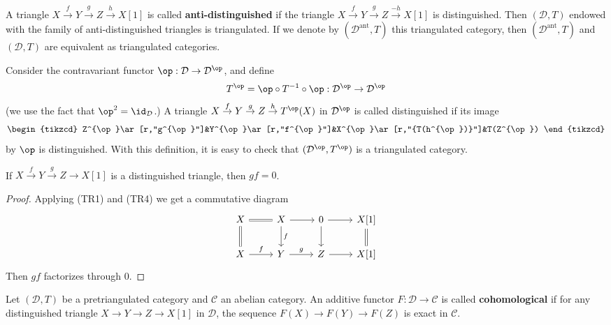 \begin{remark}
A triangle $X\stackrel{f}{\to} Y\stackrel{g}{\to} Z\stackrel{h}{\to} X[1]$ is called \textbf{anti-distinguished} if the triangle $X\stackrel{f}{\to} Y\stackrel{g}{\to} Z\stackrel{-h}{\to} X[1]$ is distinguished. Then $(\mathcal{D},T)$ endowed with the family of anti-distinguished triangles is triangulated. If we denote by $(\mathcal{D}^{\text{ant}},T)$ this triangulated category, then $(\mathcal{D}^{\text{ant}},T)$ and $(\mathcal{D},T)$ are equivalent as triangulated categories.
\end{remark}

\begin{remark}
Consider the contravariant functor $\op:\mathcal{D}\to\mathcal{D}^{\op}$, and define
\[T^{\op}=\op\circ T^{-1}\circ\op:\mathcal{D}^{\op}\to\mathcal{D}^{\op}\]
(we use the fact that $\op^2=\id_\mathcal{D}$.) A triangle $X\stackrel{f}{\to} Y\stackrel{g}{\to} Z\stackrel{h}{\to} T^{\op}(X)$ in $\mathcal{D}^{\op}$ is called distinguished if its image
\[\begin{tikzcd}
Z^{\op}\ar[r,"g^{\op}"]&Y^{\op}\ar[r,"f^{\op}"]&X^{\op}\ar[r,"{T(h^{\op})}"]&T(Z^{\op})
\end{tikzcd}
\]
by $\op$ is distinguished. With this definition, it is easy to check that $(\mathcal{D}^{\op},T^{\op})$ is a triangulated category.
\end{remark}

\begin{proposition}\label{triangle cat dt composition zero}
If $X\stackrel{f}{\to} Y\stackrel{g}{\to} Z\to X[1]$ is a distinguished triangle, then $gf=0$.
\end{proposition}
\begin{proof}
Applying (TR1) and (TR4) we get a commutative diagram
\[\begin{tikzcd}
X\ar[r,equal]\ar[d,equal]&X\ar[d,"f"]\ar[r]&0\ar[d]\ar[r]&X[1]\ar[d,equal]\\
X\ar[r,"f"]&Y\ar[r,"g"]&Z\ar[r]&X[1]
\end{tikzcd}\]
Then $gf$ factorizes through $0$.
\end{proof}

\begin{definition}
Let $(\mathcal{D},T)$ be a pretriangulated category and $\mathcal{C}$ an abelian category. An additive functor $F:\mathcal{D}\to\mathcal{C}$ is called \textbf{cohomological} if for any distinguished triangle $X\to Y\to Z\to X[1]$ in $\mathcal{D}$, the sequence $F(X)\to F(Y)\to F(Z)$ is exact in $\mathcal{C}$.
\end{definition}

